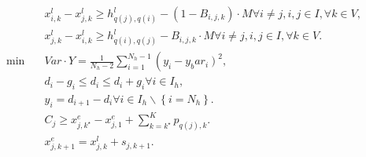\begin{align}
  & x_{i , k}^{l} - x_{j , k}^{l} \geq h_{q \left(j\right) , q \left(i\right)}^{l} - \left(1 - B_{i , j , k}\right) \cdot M \forall i \neq j , i , j \in I , \forall k \in V , \tag{eq\_0015} \\
  & x_{j , k}^{l} - x_{i , k}^{l} \geq h_{q \left(i\right) , q \left(j\right)}^{l} - B_{i , j , k} \cdot M \forall i \neq j , i , j \in I , \forall k \in V . \tag{eq\_0016} \\
  \min\quad & Var \cdot Y = \frac{1}{N_{h} - 2} \sum_{i = 1}^{N_{h} - 1} \left(\right. y_{i} - y_bar_{i} \left.\right)^{2} , \tag{eq\_0017} \\
  & {d}_{i} - g_{i} \leq d_{i} \leq {d}_{i} + g_{i} \forall i \in I_{h} , \tag{eq\_0021} \\
  & y_{i} = d_{i + 1} - d_{i} \forall i \in I_{h} \backslash \left\{i = N_{h}\right\} . \tag{eq\_0022} \\
  & C_{j} \geq x_{j , k^{\star}}^{e} - x_{j , 1}^{e} + \sum_{k = k^{\star}}^{K} p_{q \left(j\right) , k} . \tag{eq\_0027} \\
  & x_{j , k + 1}^{e} = x_{j , k}^{l} + s_{j , k + 1} . \tag{eq\_0028} \\
\end{align}
